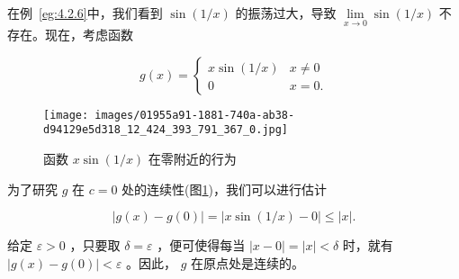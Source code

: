 \begin{Eg}
  \label{eg:4.3.6}
在例~\ref{eg:4.2.6}中，我们看到 \(\sin \left( {1/x}\right)\) 的振荡过大，导致 \(\mathop{\lim }\limits_{{x \rightarrow  0}}\sin \left( {1/x}\right)\) 不存在。现在，考虑函数

\[
g\left( x\right)  = \left\{  \begin{array}{ll} x\sin \left( {1/x}\right) & x \neq  0 \\  0 & x = 0. \end{array}\right.
\]


\begin{figure}[h]
  \centering
  \texttt{[image: images/01955a91-1881-740a-ab38-d94129e5d318\_12\_424\_393\_791\_367\_0.jpg]}
  \caption{函数 \(x\sin \left( {1/x}\right)\) 在零附近的行为}
  \label{fig:4.6}
\end{figure}
为了研究 \(g\) 在 \(c = 0\) 处的连续性(图\ref{fig:4.6})，我们可以进行估计

\[
\left| {g\left( x\right)  - g\left( 0\right) }\right|  = \left| {x\sin \left( {1/x}\right)  - 0}\right|  \leq  \left| x\right| .
\]

给定 \(\varepsilon  > 0\) ，只要取 \(\delta  = \varepsilon\) ，便可使得每当 \(\left| {x - 0}\right|  = \left| x\right|  < \delta\) 时，就有 \(\left| {g\left( x\right)  - g\left( 0\right) }\right|  < \varepsilon\) 。因此， \(g\) 在原点处是连续的。
\end{Eg}



